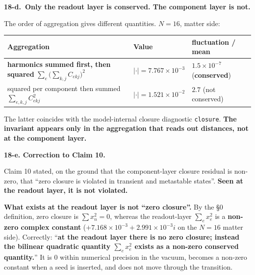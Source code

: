 \documentclass[
  10pt,
]{article}
\newcounter{none} %
\begin{document}
\textbf{18-d.~Only the readout layer is conserved. The component layer
is not.}

The order of aggregation gives different quantities. \(N=16\), matter
side:

{\def\LTcaptype{none} %
\begin{longtable}[]{@{}
  >{\raggedright\arraybackslash}p{}
  >{\raggedright\arraybackslash}p{}
  >{\raggedright\arraybackslash}p{}@{}}
\toprule\noalign{}
\begin{minipage}[b]{\linewidth}\raggedright
Aggregation
\end{minipage} & \begin{minipage}[b]{\linewidth}\raggedright
Value
\end{minipage} & \begin{minipage}[b]{\linewidth}\raggedright
fluctuation / mean
\end{minipage} \\
\midrule\noalign{}
\endhead
\bottomrule\noalign{}
\endlastfoot
\textbf{harmonics summed first, then squared}
\(\sum_e\big(\sum_{k,j}C_{ekj}\big)^2\) &
\(\lvert\cdot\rvert = 7.767\times10^{-3}\) & \(1.5\times10^{-7}\)
(\textbf{conserved}) \\
squared per component then summed \(\sum_{e,k,j}C_{ekj}^2\) &
\(\lvert\cdot\rvert = 1.521\times10^{-2}\) & \(2.7\) (not conserved) \\
\end{longtable}
}

The latter coincides with the model-internal closure diagnostic
\texttt{closure}. \textbf{The invariant appears only in the aggregation
that reads out distances, not at the component layer.}

\textbf{18-e. Correction to Claim 10.}

Claim 10 stated, on the ground that the component-layer closure residual
is non-zero, that ``zero closure is violated in transient and metastable
states''. \textbf{Seen at the readout layer, it is not violated.}

\textbf{What exists at the readout layer is not ``zero closure''.} By
the §0 definition, zero closure is \(\sum x_n^2 = 0\), whereas the
readout-layer \(\sum_e x_e^2\) is a \textbf{non-zero complex constant}
(\(+7.168\times10^{-3}+2.991\times10^{-3}i\) on the \(N=16\) matter
side). Correctly: ``\textbf{at the readout layer there is no zero
closure; instead the bilinear quadratic quantity \(\sum_e x_e^2\) exists
as a non-zero conserved quantity.}'' It is \(0\) within numerical
precision in the vacuum, becomes a non-zero constant when a seed is
inserted, and does not move through the transition.
\end{document}
